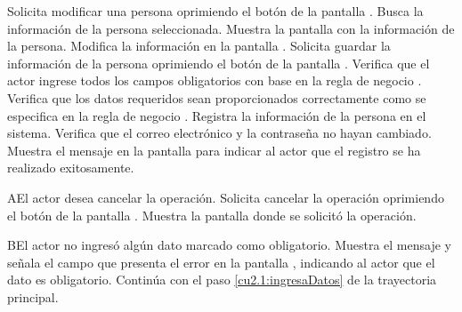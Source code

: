  \begin{UCtrayectoria}
    \UCpaso[\UCactor] Solicita modificar una persona oprimiendo el botón  de la pantalla .
    \UCpaso[\UCsist] Busca la información de la persona seleccionada.
    \UCpaso[\UCsist] Muestra la pantalla  con la información de la persona. 
    \UCpaso[\UCactor] Modifica la información en la pantalla . \label{cu2.1:ingresaDatos}
    \UCpaso[\UCactor] Solicita guardar la información de la persona oprimiendo el botón  de la pantalla .  
    \UCpaso[\UCsist] Verifica que el actor ingrese todos los campos obligatorios con base en la regla de negocio  . 
    \UCpaso[\UCsist] Verifica que los datos requeridos sean proporcionados correctamente como se especifica en la regla de negocio .  
    \UCpaso[\UCsist] Registra la información de la persona en el sistema.
    \UCpaso[\UCsist] Verifica que el correo electrónico y la contraseña no hayan cambiado. 
    \UCpaso[\UCsist] Muestra el mensaje  en la pantalla 
    para indicar al actor que el registro se ha realizado exitosamente. \label{cu2.2:muestraMensaje}
 \end{UCtrayectoria}
 \begin{UCtrayectoriaA}{A}{El actor desea cancelar la operación.}
    \UCpaso[\UCactor] Solicita cancelar la operación oprimiendo el botón  de la pantalla .
    \UCpaso[\UCsist] Muestra la pantalla donde se solicitó la operación.
 \end{UCtrayectoriaA} 
 \begin{UCtrayectoriaA}{B}{El actor no ingresó algún dato marcado como obligatorio.}
    \UCpaso[\UCsist] Muestra el mensaje  y señala el campo que presenta el error en la pantalla 
	    , indicando al actor que el dato es obligatorio.
    \UCpaso[] Continúa con el paso \ref{cu2.1:ingresaDatos} de la trayectoria principal.
 \end{UCtrayectoriaA}
